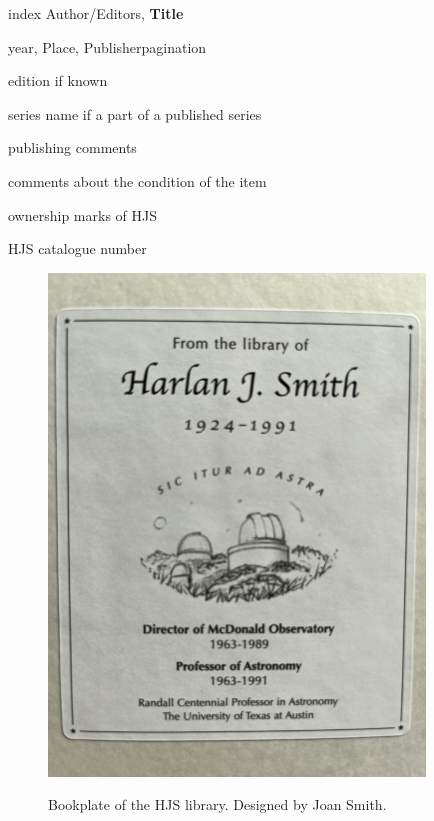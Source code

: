 \footnotesize{index} Author/Editors, {\bf Title}

year, Place, Publisher\hspace{1em}pagination

edition if known

series name if a part of a published series

publishing comments

comments about the condition of the item

ownership marks of HJS

HJS catalogue number
\clearpage
\begin{figure}
  \centering
  \includegraphics{hjs_bookplate_small.png}
  
  Bookplate of the HJS library. Designed by Joan Smith.
  \label{fig:bookplate}
\end{figure}


